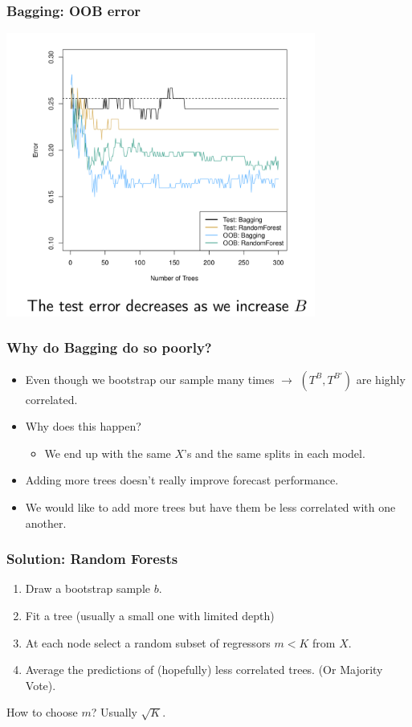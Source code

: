 \documentclass[xcolor=pdftex,dvipsnames,table,mathserif,aspectratio=169]{beamer}
\begin{document}
\begin{frame}
\frametitle{Bagging: OOB error}
\includegraphics[width=4in]{./resources/bagging.png}
\end{frame}

\begin{frame}
\frametitle{Why do Bagging do so poorly?}
\begin{itemize}
\item Even though we bootstrap our sample many times $\rightarrow$ $(T^B,T^{B'})$ are highly correlated.
\item Why does this happen?
\begin{itemize}
\item We end up with the same $X$'s and the same splits in each model.
\end{itemize}
\item Adding more trees doesn't really improve forecast performance.
\item We would like to add more trees but have them be \alert{less correlated} with one another.
\end{itemize}
\end{frame}


\begin{frame}
\frametitle{Solution: Random Forests}
\begin{enumerate}
\item Draw a bootstrap sample $b$.
\item Fit a tree (usually a small one with limited depth)
\item At each node select a \alert{random subset} of regressors $m < K$ from $X$.
\item Average the predictions of (hopefully) less correlated trees. (Or Majority Vote).
\end{enumerate}
How to choose $m$? Usually $\sqrt{K}$.
\end{frame}
\end{document}

